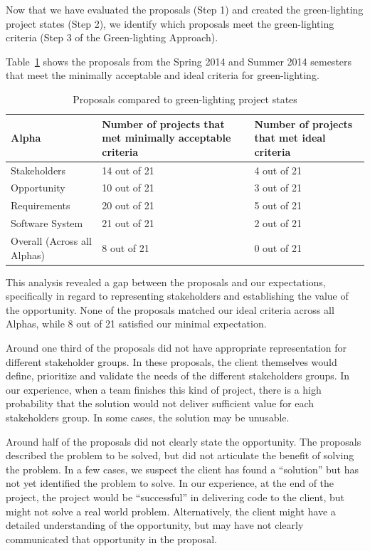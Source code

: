 \documentclass[conference]{IEEEtran}
\begin{document}
Now that we have evaluated the proposals (Step 1) and created the
green-lighting project states (Step 2), we identify which proposals
meet the green-lighting criteria (Step 3 of the Green-lighting Approach). 

Table~\ref{table_proposal_evaluations} shows the proposals from the Spring 2014 and Summer 2014 semesters that meet the minimally acceptable and ideal criteria for green-lighting. 

\begin{table}
\caption{Proposals compared to green-lighting project states}
\label{table_proposal_evaluations}
\begin{tabular}{|l|p{1.10in}|p{1.10in}|}
\hline
Alpha & Number of projects that met minimally acceptable criteria & Number of projects that met ideal criteria \\ \hline
Stakeholders & 14 out of 21 & 4 out of 21 \\ \hline
Opportunity & 10 out of 21 & 3 out of 21 \\ \hline
Requirements & 20 out of 21 & 5 out of 21 \\ \hline
Software System & 21 out of 21 & 2 out of 21 \\ \hline
Overall (Across all Alphas) & 8 out of 21 & 0 out of 21 \\ \hline
\end{tabular}
\end{table}

This analysis revealed a gap between the proposals and our
expectations, specifically in regard to representing stakeholders and
establishing the value of the opportunity. None of the proposals matched our ideal criteria across all Alphas, while 8 out of 21 satisfied our minimal expectation.

Around one third of the proposals did not have appropriate
representation for different stakeholder groups. In these proposals, the
client themselves would define, prioritize and validate the needs of the
different stakeholders groups. In our experience, when a team finishes
this kind of project, there is a high probability that the solution
would not deliver sufficient value for each stakeholders group. In some
cases, the solution may be unusable.

Around half of the proposals did not clearly state the
opportunity. The proposals described the problem to be solved, but did
not articulate the benefit of solving the problem. In a few cases, we
suspect the client has found a ``solution'' but has not yet identified
the problem to solve. In our experience, at the end of the project,
the project would be ``successful'' in delivering code to the client,
but might not solve a real world problem. Alternatively, the client
might have a detailed understanding of the opportunity, but may have not
clearly communicated that opportunity in the proposal.
\end{document}
